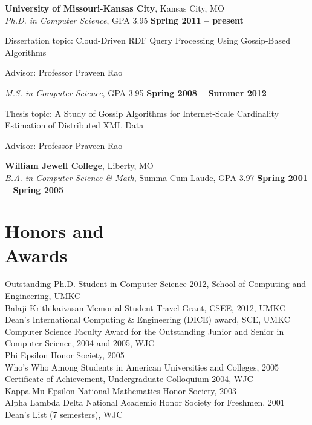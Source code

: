 \documentclass[margin,line]{resume}
\begin{document}
\begin{resume}
    \textbf{University of Missouri-Kansas City}, Kansas City, MO\\
    \textsl{Ph.D. in Computer Science}, GPA 3.95 \hfill \textbf{Spring 2011 -- present}\vspace{-3mm}\\\vspace{-1mm}%
    \begin{list2}
        \item Dissertation topic: Cloud-Driven RDF Query Processing Using Gossip-Based Algorithms
        \item Advisor:  Professor Praveen Rao
    \end{list2}\vspace{-1.5mm}
    \textsl{M.S. in Computer Science}, GPA 3.95 \hfill \textbf{Spring 2008 -- Summer 2012}\vspace{-3mm}\\\vspace{-1mm}%
    \begin{list2}
        \item Thesis topic: A Study of Gossip Algorithms for Internet-Scale Cardinality Estimation of Distributed XML Data
        \item Advisor:  Professor Praveen Rao
    \end{list2}\vspace{-1.5mm}
    \textbf{William Jewell College}, Liberty, MO\\
    \textsl{B.A. in Computer Science \& Math}, Summa Cum Laude, GPA 3.97 \hfill \textbf{Spring 2001 -- Spring 2005}\vspace{-3mm}\\\vspace{-1mm}%

    \section{\mysidestyle Honors and\\Awards} 

    Outstanding Ph.D. Student in Computer Science 2012, School of Computing and Engineering, UMKC\\
    Balaji Krithikaivasan Memorial Student Travel Grant, CSEE, 2012, UMKC\\
    Dean's International Computing \& Engineering (DICE) award, SCE, UMKC\\
    Computer Science Faculty Award for the Outstanding Junior and Senior in Computer Science, 2004 and 2005, WJC\\
    Phi Epsilon Honor Society, 2005\\
    Who's Who Among Students in American Universities and Colleges, 2005\\
    Certificate of Achievement, Undergraduate Colloquium 2004, WJC\\
    Kappa Mu Epsilon National Mathematics Honor Society, 2003\\
    Alpha Lambda Delta National Academic Honor Society for Freshmen, 2001\\
    Dean's List (7 semesters), WJC


\end{resume}
\end{document}
